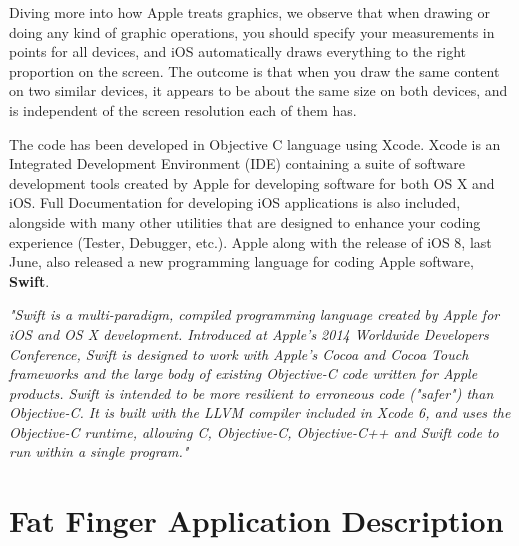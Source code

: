 Diving more into how Apple treats graphics, we observe that when drawing or doing any kind of graphic operations, you should specify your measurements in points for all devices, and iOS automatically draws everything to the right proportion on the screen.  The outcome is that when you draw the same content on two similar devices, it appears to be about the same size on both devices, and is independent of the screen resolution each of them has. 

The   code   has   been   developed in Objective C language using Xcode. Xcode is an Integrated Development Environment (IDE) containing a suite of software development tools created by Apple for developing software for both OS X and iOS. Full Documentation for developing iOS applications is also included, alongside with many other utilities that are designed to enhance your coding experience (Tester, Debugger, etc.). Apple along with the release of iOS 8, last June, also released a new programming language for coding Apple software, \textbf{Swift}.

\emph{"Swift is a multi-paradigm, compiled programming language created by Apple for iOS and OS X development. Introduced at Apple's 2014 Worldwide Developers Conference, Swift is designed to work with Apple's Cocoa and Cocoa Touch frameworks and the large body of existing Objective-C code written for Apple products. Swift is intended to be more resilient to erroneous code ("safer") than Objective-C. It is built with the LLVM compiler included in Xcode 6, and uses the Objective-C runtime, allowing C, Objective-C, Objective-C++ and Swift code to run within a single program."} \cite{wikiSwift}












\section{Fat Finger Application Description}


